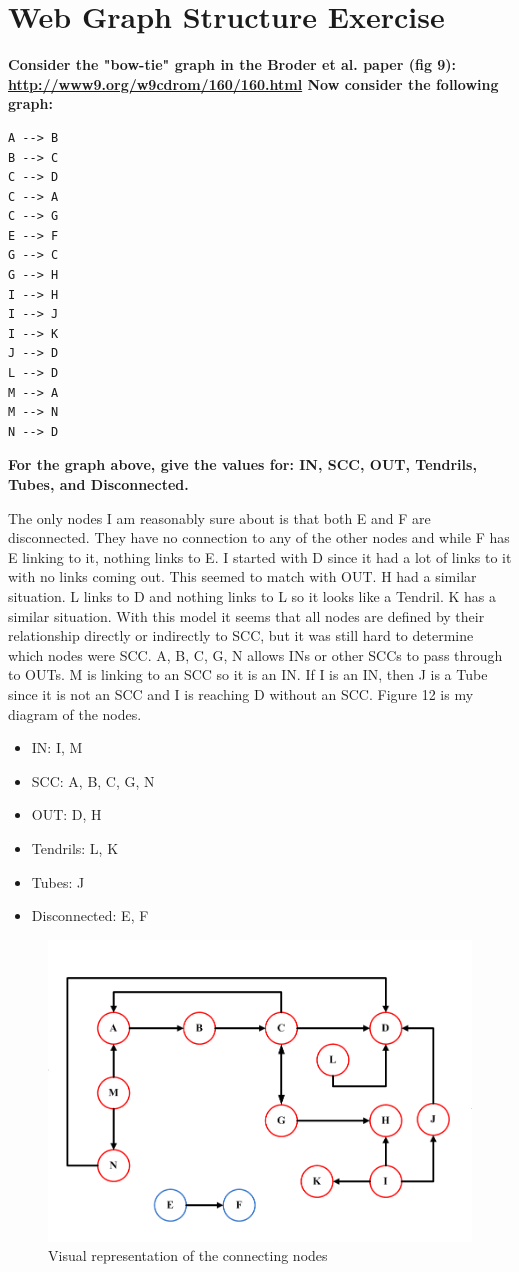 \documentclass{article}
\begin{document}
\newpage

\section{Web Graph Structure Exercise}
\textbf{Consider the "bow-tie" graph in the Broder et al. paper (fig 9): \url{http://www9.org/w9cdrom/160/160.html}
Now consider the following graph:}

\begin{verbatim}
A --> B
B --> C
C --> D
C --> A
C --> G
E --> F
G --> C
G --> H
I --> H
I --> J
I --> K
J --> D 
L --> D
M --> A
M --> N
N --> D
\end{verbatim}

\textbf{For the graph above, give the values for: IN, SCC, OUT, Tendrils, Tubes, and Disconnected.}

The only nodes I am reasonably sure about is that both E and F are disconnected. They have no connection to any of the other nodes and while F has E linking to it, nothing links to E. I started with D since it had a lot of links to it with no links coming out. This seemed to match with OUT. H had a similar situation. L links to D and nothing links to L so it looks like a Tendril. K has a similar situation. With this model it seems that all nodes are defined by their relationship directly or indirectly to SCC, but it was still hard to determine which nodes were SCC. A, B, C, G, N allows INs or other SCCs to pass through to OUTs. M is linking to an SCC so it is an IN. If I is an IN, then J is a Tube since it is not an SCC and I is reaching D without an SCC. Figure 12 is my diagram of the nodes.

\begin{itemize}
\item IN: I, M
\item SCC: A, B, C, G, N
\item OUT: D, H
\item Tendrils: L, K
\item Tubes: J
\item Disconnected: E, F
\end{itemize}


\begin{figure}[H]
\centering
\includegraphics[scale=0.50]{assn01Q03}
\caption{Visual representation of the connecting nodes}
\end{figure}
\end{document}
